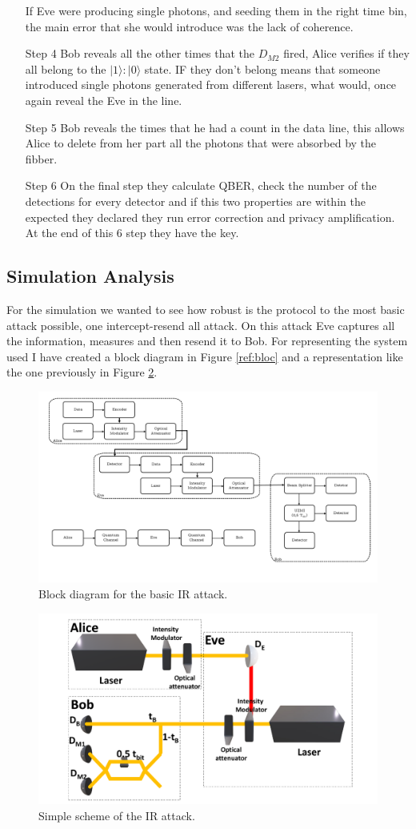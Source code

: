 \begin{refsection}
\begin{itemize}
If Eve were producing single photons, and seeding them in the right time bin, the main error that she would introduce was the lack of coherence.

\item [Step 4] Bob reveals all the other times that the $D_{M2}$ fired, Alice verifies if they all belong to the $|1\rangle:|0\rangle$ state. IF they don't belong means that someone introduced single photons generated from different lasers, what would, once again reveal the Eve in the line.

\item [Step 5] Bob reveals the times that he had a count in the data line, this allows Alice to delete from her part all the photons that were absorbed by the fibber.

\item [Step 6] On the final step they calculate QBER, check the number of the detections for every detector and if this two properties are within the expected they declared they run error correction and privacy amplification. At the end of this 6 step they have the key.

\end{itemize}

\subsection{Simulation Analysis}

For the simulation we wanted to see how robust is the protocol to the most basic attack possible, one intercept-resend all attack. On this attack Eve captures all the information, measures and then resend it to Bob. For representing the system used I have created a block diagram in Figure \ref{ref:bloc} and a representation like the one previously in Figure \ref{fig:E}.

\begin{figure}[h]
\centering
\includegraphics[width=0.4\linewidth]{./sdf/tq_76558_cow_protocol/slides/figures/Diagrama_de_blocos.pdf}
\caption{Block diagram for the basic IR attack.}
\label{fig:bloc}
\end{figure}

\begin{figure}[h]
\centering
\includegraphics[width=0.4\linewidth]{./sdf/tq_76558_cow_protocol/slides/figures/E.pdf}
\caption{Simple scheme of the IR attack.}
\label{fig:E}
\end{figure}


\end{refsection}
